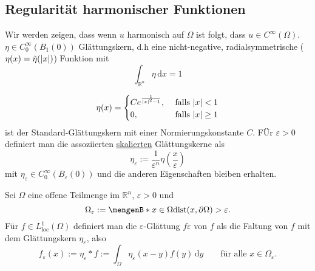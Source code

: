 \subsection{Regularität harmonischer Funktionen} 
\label{sub:regularitat_harmonischer_funktionen}
Wir werden zeigen, dass wenn $u$ harmonisch auf $\Omega$ ist folgt, dass $u \in C^{\infty}(\Omega)$.
$\eta \in C^{\infty}_0(B_1(0))$ Glättungskern, d.h eine nicht-negative, radialsymmetrische ($\eta(x)=\tilde\eta(\lvert x\rvert)$) Funktion mit
\[
	\int_{\mathbb{R}^n}^{}\eta \,\mathrm{d}x = 1
\]	
\begin{beispiel}
	\begin{equation}
		\eta(x) = \begin{cases}
			C e^{\frac{1}{\lvert x\rvert^2-1}}, &\text{ falls }\lvert x\rvert<1\\
			0 , &\text{ falls }\lvert x\rvert\geq 1\\
		\end{cases}
	\end{equation}
	ist der Standard-Glättungskern mit einer Normierungskonstante $C$. FÜr $\varepsilon > 0$ definiert man die assoziierten \underline{skalierten} Glättungskerne als
	\[
		\eta_{\varepsilon}:= \frac{1}{\varepsilon^n}\eta \left( \frac{x}{\varepsilon} \right)
	\]
	mit $\eta_{\varepsilon} \in C_0^{\infty}(B_{\varepsilon}(0))$ und die anderen Eigenschaften bleiben erhalten.
\end{beispiel}
\begin{definition}
	Sei $\Omega$ eine offene Teilmenge im $\mathbb{R}^n$, $\varepsilon >0$ und \[
		\Omega_{\varepsilon} := \set[x \in \Omega]{\dist(x,\partial \Omega)> \varepsilon}.
	\]Für $f \in L^1_{\text{loc}}(\Omega)$ definiert man die $\varepsilon$-Glättung $f \varepsilon$ von $f$ als die Faltung von $f$ mit dem Glättungskern $\eta_{\varepsilon}$, also
	\[
		f_{\varepsilon}(x):= \eta_{\varepsilon} * f := \int_{\Omega}^{}\eta_{\varepsilon}(x-y)f(y) \,\mathrm{d}y \qquad \text{für alle }x \in \Omega_{\varepsilon}.
	\]
\end{definition}
\cleardoubleoddemptypage
{}
\setcounter{page}{1}

